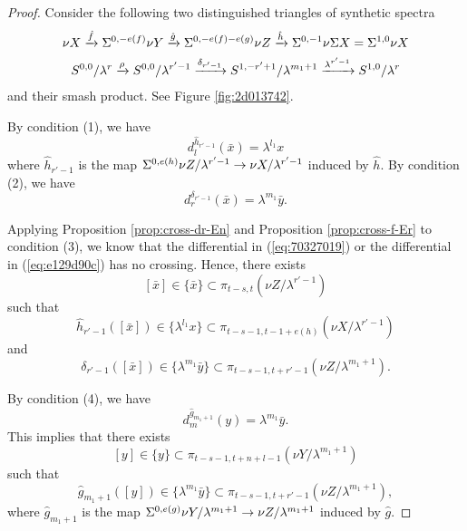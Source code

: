 \documentclass{amsart}
\numberwithin{equation}{section}
\begin{document}
\begin{proof}
    Consider the following two distinguished triangles of synthetic spectra
    \begin{gather*}
        \nu X\xrightarrow{\hat f} \Sigma^{0,-e(f)}\nu Y\xrightarrow{\hat g} \Sigma^{0,-e(f)-e(g)}\nu Z\xrightarrow{\hat h} \Sigma^{0,-1}\nu \Sigma X=\Sigma^{1,0}\nu X\\
        S^{0,0}/\lambda^{r}\xrightarrow{\rho} S^{0,0}/\lambda^{r'-1} \xrightarrow{\delta_{r'-1}} S^{1,-r'+1}/\lambda^{m_1+1} \xrightarrow{\lambda^{r'-1}} S^{1,0}/\lambda^{r}
    \end{gather*}
    and their smash product. See Figure \ref{fig:2d013742}.

    By condition (1), we have
    \begin{equation}\label{eq:70327019}
        d^{\hat h_{r'-1}}_l(\bar x)=\lambda^{l_1}x
    \end{equation}
    where $\hat h_{r'-1}$ is the map $\Sigma^{0,e(h)}\nu Z/\lambda^{r'-1}\to \nu X/\lambda^{r'-1}$ induced by $\hat h$.
    By condition (2), we have
    \begin{equation}\label{eq:e129d90c}
        d^{\delta_{r'-1}}_r(\bar x)=\lambda^{m_1}\bar y.
    \end{equation}
 
    
    Applying Proposition \ref{prop:cross-dr-En} and Proposition \ref{prop:cross-f-Er} to condition (3), we know that the differential in (\ref{eq:70327019}) or the differential in (\ref{eq:e129d90c}) has no crossing. Hence, there exists
    $$[\bar x]\in \{\bar x\}\subset \pi_{t-s,t}(\nu Z/\lambda^{r'-1})$$
    such that
    $$\hat h_{r'-1}([\bar x])\in \{\lambda^{l_1}x\}\subset \pi_{t-s-1, t-1+e(h)}(\nu X/\lambda^{r'-1})$$
    and
    $$\delta_{r'-1}([\bar x])\in \{\lambda^{m_1}\bar y\}\subset \pi_{t-s-1,t+r'-1}(\nu Z/\lambda^{m_1+1}).$$

    By condition (4), we have
    \begin{equation*}
        d^{\hat g_{m_1+1}}_m(y)=\lambda^{m_1}\bar y.
    \end{equation*}
    This implies that there exists
    $$[y]\in \{y\}\subset \pi_{t-s-1,t+n+l-1}(\nu Y/\lambda^{m_1+1})$$
    such that
    $$\hat g_{m_1+1}([y])\in \{\lambda^{m_1}\bar y\}\subset \pi_{t-s-1, t+r'-1}(\nu Z/\lambda^{m_1+1}),$$
    where $\hat g_{m_1+1}$ is the map $\Sigma^{0,e(g)}\nu Y/\lambda^{m_1+1}\to \nu Z/\lambda^{m_1+1}$ induced by $\hat g$.
    

\end{proof}
\end{document}
